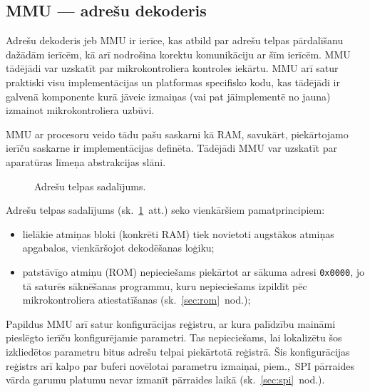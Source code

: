 

\subsection{MMU — adrešu dekoderis} \label{sec:mmu}
	Adrešu dekoderis jeb MMU ir ierīce, kas atbild par adrešu telpas
	pārdalīšanu dažādām ierīcēm, kā arī nodrošina korektu komunikāciju
	ar šīm ierīcēm. MMU tādējādi var uzskatīt par mikrokontroliera kontroles
	iekārtu. MMU arī satur praktiski visu implementācijas un platformas
	specifisko kodu, kas tādējādi ir galvenā komponente kurā jāveic izmaiņas
	(vai pat jāimplementē no jauna) izmainot mikrokontroliera uzbūvi.
	
	MMU ar procesoru veido tādu pašu saskarni kā RAM,
	savukārt, piekārtojamo ierīču saskarne ir implementācijas definēta.
	Tādējādi MMU var uzskatīt par aparatūras līmeņa abstrakcijas slāni.
	
	\begin{figure}[thp]
		\centering
		\def\svgwidth{0.9\textwidth}
		{\ttfamily\small}
		\caption{Adrešu telpas sadalījums.}
		\label{fig:memory-map}
	\end{figure}
	
	Adrešu telpas sadalījums (sk.~\ref{fig:memory-map}~att.) seko vienkāršiem pamatprincipiem:
	\begin{itemize}
		\item lielākie atmiņas bloki (konkrēti RAM) tiek novietoti augstākos
			atmiņas apgabalos, vienkāršojot dekodēšanas loģiku;
		\item patstāvīgo atmiņu (ROM) nepieciešams piekārtot ar sākuma
			adresi \texttt{0x0000}, jo tā saturēs sāknēšanas programmu,
			kuru nepieciešams izpildīt pēc mikrokontroliera atiestatīšanas
			(sk.~\ref{sec:rom}~nod.);
	\end{itemize}
	
	Papildus MMU arī satur konfigurācijas reģistru,
	ar kura palīdzību maināmi pieslēgto ierīču konfigurējamie parametri.
	Tas nepieciešams, lai lokalizētu šos izkliedētos parametru bitus
	adrešu telpai piekārtotā reģistrā. Šis konfigurācijas reģistrs arī kalpo
	par buferi novēlotai parametru izmaiņai, piem.,~SPI pārraides vārda garumu
	platumu nevar izmanīt pārraides laikā (sk.~\ref{sec:spi}~nod.).
	


